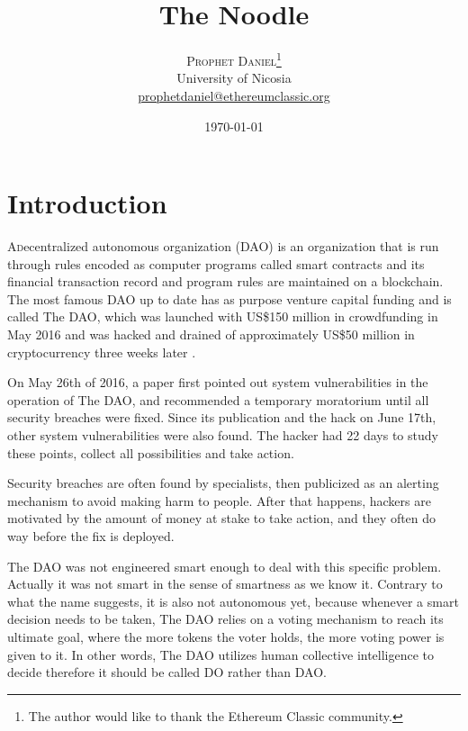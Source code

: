 \documentclass[twoside,twocolumn]{article}
\title{The Noodle} %
\author{%
\textsc{Prophet Daniel}\thanks{The author would like to thank the Ethereum Classic community.} \\[1ex] %
\normalsize University of Nicosia \\ %
\normalsize \href{mailto:prophetdaniel@ethereumclassic.org}{prophetdaniel@ethereumclassic.org} %
}
\date{\today} %
\begin{document}
\maketitle


\section{Introduction}

\lettrine[nindent=0em,lines=3]{A} decentralized autonomous organization (DAO) is an organization that is run through rules encoded as computer programs called smart contracts and its financial transaction record and program rules are maintained on a blockchain.
The most famous DAO up to date has as purpose venture capital funding and is called The DAO, which was launched with US\$150 million in crowdfunding in May 2016 and was hacked and drained of approximately US\$50 million in cryptocurrency three weeks later \cite{Price2016}.\par 
On May 26th of 2016, a paper\cite{Popper2016} first pointed out system vulnerabilities in the operation of The DAO, and recommended a temporary moratorium until all security breaches were fixed. Since its publication and the hack on June 17th, other system vulnerabilities were also found. The hacker had 22 days to study these points, collect all possibilities and take action.\par
Security breaches are often found by specialists\cite{Perlroth2014}, then publicized as an alerting mechanism to avoid making harm to people. After that happens, hackers are motivated by the amount of money at stake to take action, and they often do way before the fix is deployed.\par
The DAO was not engineered smart enough to deal with this specific problem. Actually it was not smart in the sense of smartness as we know it. Contrary to what the name suggests, it is also not autonomous yet, because whenever a smart decision needs to be taken, The DAO relies on a voting mechanism to reach its ultimate goal, where the more tokens the voter holds, the more voting power is given to it. In other words, The DAO utilizes human collective intelligence to decide therefore it should be called DO rather than DAO.

\end{document}
